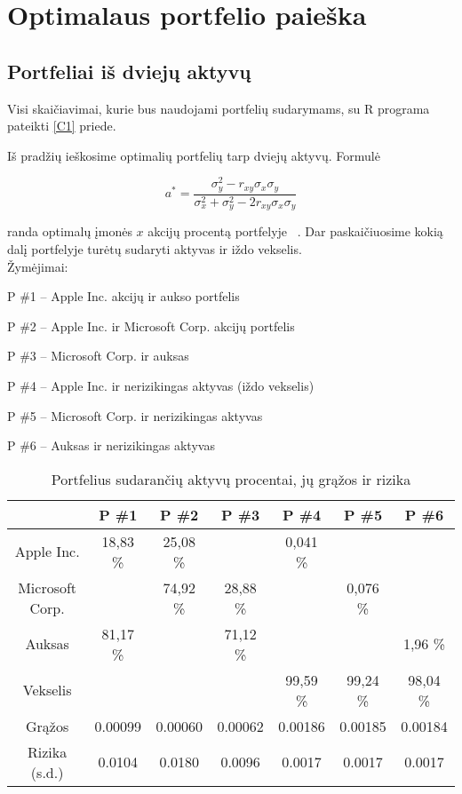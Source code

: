 \documentclass[12pt, a14paper, lithuanian]{article}
\begin{document}
\newpage
\section{Optimalaus portfelio paieška}   


\subsection{Portfeliai iš dviejų aktyvų}

Visi skaičiavimai, kurie bus naudojami portfelių sudarymams, su R programa pateikti \ref{C1} priede.
 
Iš pradžių ieškosime optimalių portfelių tarp dviejų aktyvų. Formulė

\begin{equation}
a^{\ast}= \frac{\sigma_y^2 - r_{xy}\sigma_x \sigma_y}{\sigma^2_x + \sigma^2_y - 2r_{xy}\sigma_x \sigma_y} \label{form}
\end{equation}

randa optimalų įmonės $x$ akcijų procentą portfelyje ~\cite{cope}. Dar paskaičiuosime kokią dalį portfelyje turėtų sudaryti aktyvas ir iždo vekselis. \\

Žymėjimai:

P \#1 -- Apple Inc. akcijų ir aukso portfelis

P \#2 -- Apple Inc. ir Microsoft Corp. akcijų portfelis

P \#3 -- Microsoft Corp. ir auksas

P \#4 -- Apple Inc. ir nerizikingas aktyvas (iždo vekselis)

P \#5 -- Microsoft Corp. ir nerizikingas aktyvas

P \#6 -- Auksas ir nerizikingas aktyvas

\begin{table}[ht]
\begin{center}
\begin{tabular}{ccccccc}
  \hline
 & P \#1 & P \#2 & P \#3 & P \#4 & P \#5 & P \#6 \\ 
  \hline
Apple Inc. & 18,83 \% & 25,08 \% &  & 0,041 \%  & & &\\
\hline
 Microsoft Corp. &  & 74,92 \% & 28,88 \% & & 0,076 \% & & \\ 
   \hline
   Auksas & 81,17 \% & & 71,12 \% & & & 1,96 \% & \\
   \hline
   Vekselis & & & & 99,59 \% & 99,24 \% & 98,04 \% & \\
   \hline
   Grąžos & 0.00099 & 0.00060 & 0.00062 & 0.00186 & 0.00185 & 0.00184 &\\
   \hline
   Rizika (s.d.) & 0.0104 & 0.0180 & 0.0096 & 0.0017 & 0.0017 & 0.0017 &\\
   \hline
\end{tabular}
\end{center}
\caption{Portfelius sudarančių aktyvų procentai, jų grąžos ir rizika}
\end{table}
\end{document}
